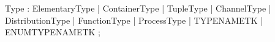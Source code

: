 %
%
%
\begin{rail}
Type : ElementaryType
     | ContainerType
     | TupleType
     | ChannelType
     | DistributionType
     | FunctionType
     | ProcessType
     | TYPENAMETK
     | ENUMTYPENAMETK
     ;
\end{rail}
